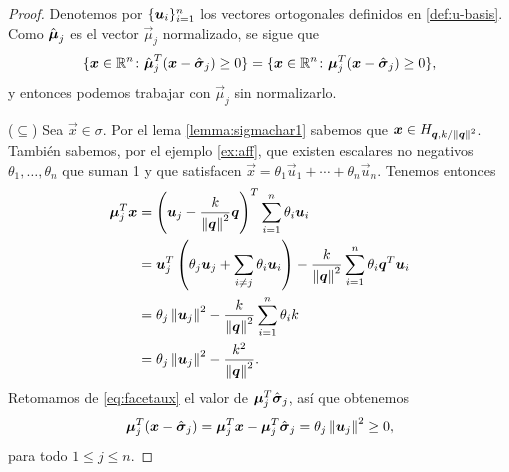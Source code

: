 \begin{proof}
	Denotemos por $\lbrace \boldsymbol{u}_i \rbrace_{i=1}^{n}$ los vectores ortogonales definidos en
	\eqref{def:u-basis}. Como $\hat{\boldsymbol{\mu}}_j$ es el vector $\vec{\mu}_j$ normalizado, se sigue que
	\begin{equation*}
		\lbrace  \boldsymbol{x} \in \mathbb{R}^n \colon \hat{\boldsymbol{\mu}}_j^T(\boldsymbol{x} - \hat{\boldsymbol{ \sigma }}_j) \geq 0 \rbrace
		=
		\lbrace  \boldsymbol{x} \in \mathbb{R}^n \colon \boldsymbol{\mu}_j^T(\boldsymbol{x} - \hat{\boldsymbol{ \sigma }}_j) \geq 0 \rbrace,
	\end{equation*}
	y entonces podemos trabajar con $\vec{\mu}_j$ sin normalizarlo. 

	($\subseteq$) Sea $\vec{x} \in \sigma$. Por el lema \ref{lemma:sigmachar1} sabemos que $\boldsymbol{x}
	\in H_{\boldsymbol{\boldsymbol{q}}, k/\left\lVert \boldsymbol{\boldsymbol{q}} \right\rVert^{2}}$. También sabemos, por el ejemplo \ref{ex:aff}, que existen escalares no
	negativos $\theta_1, \ldots, \theta_n$ que suman 1 y que satisfacen $\vec{x} = \theta_1\vec{u}_1
	+ \cdots + \theta_n\vec{u}_n$. Tenemos entonces
	\begin{align*}
		\boldsymbol{\mu}_j^T\boldsymbol{x}
		&=
		\left( \boldsymbol{u}_j - \frac{k}{\left\lVert \boldsymbol{q} \right\rVert^2}\boldsymbol{q} \right)^T
		\sum_{i=1}^{n}\theta_i\boldsymbol{u}_i \\
		&=
		\boldsymbol{u}_j^T\left( \theta_j\boldsymbol{u}_j + \sum_{i \neq j}\theta_i\boldsymbol{u}_i \right)
		- \frac{k}{\left\lVert \boldsymbol{q} \right\rVert^2}\sum_{i=1}^{n}\theta_i\boldsymbol{q}^T\boldsymbol{u}_i \\
		&=
		\theta_j\left\lVert \boldsymbol{u}_j \right\rVert^2
		- \frac{k}{\left\lVert \boldsymbol{q} \right\rVert^2}\sum_{i=1}^{n}\theta_ik \\
		&=
		\theta_j\left\lVert \boldsymbol{u}_j \right\rVert^2 - \frac{k^2}{\left\lVert \boldsymbol{q} \right\rVert^2}.
	\end{align*}
	Retomamos de \eqref{eq:facetaux} el valor de $\boldsymbol{\mu}_j^T\hat{\boldsymbol{ \sigma }}_j$, así que obtenemos
	\begin{equation*}
		\boldsymbol{\mu}_j^T(\boldsymbol{x} - \hat{\boldsymbol{ \sigma }}_j)
		= 
		\boldsymbol{\mu}_j^T\boldsymbol{x} - \boldsymbol{\mu}_j^T\hat{\boldsymbol{ \sigma }}_j
		=
		\theta_j\left\lVert \boldsymbol{u}_j \right\rVert^2 \geq 0,
	\end{equation*}
	para todo $1 \leq j \leq n$.


\end{proof}
